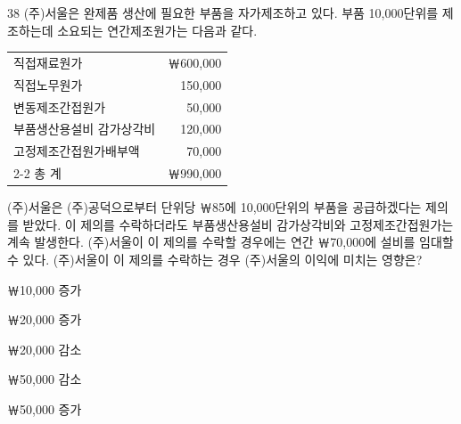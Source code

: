 \begin{question}{38}
(주)서울은 완제품 생산에 필요한 부품을 자가제조하고 있다. 부품 10,000단위를 제조하는데 소요되는 연간제조원가는 다음과 같다.
\begin{center}
\small
\begin{tabular}{|l r|}
\hline
직접재료원가 & ￦600,000 \\
직접노무원가 & 150,000 \\
변동제조간접원가 & 50,000 \\
부품생산용설비 감가상각비 & 120,000 \\
고정제조간접원가배부액 & 70,000 \\
\cline{2-2}
\hspace{2em}총 계 & ￦990,000 \\
\hline
\end{tabular}
\end{center}
(주)서울은 (주)공덕으로부터 단위당 ￦85에 10,000단위의 부품을 공급하겠다는 제의를 받았다. 이 제의를 수락하더라도 부품생산용설비 감가상각비와 고정제조간접원가는 계속 발생한다. (주)서울이 이 제의를 수락할 경우에는 연간 ￦70,000에 설비를 임대할 수 있다. (주)서울이 이 제의를 수락하는 경우 (주)서울의 이익에 미치는 영향은? \par
\begin{choices}
  \item ￦10,000 증가
  \item ￦20,000 증가
  \item ￦20,000 감소
  \item ￦50,000 감소
  \item ￦50,000 증가
\end{choices}
\end{question}
